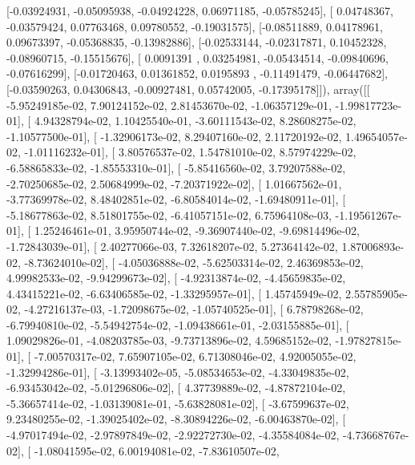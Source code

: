 \documentclass{article}
\begin{document}
       [-0.03924931, -0.05095938, -0.04924228,  0.06971185, -0.05785245],
       [ 0.04748367, -0.03579424,  0.07763468,  0.09780552, -0.19031575],
       [-0.08511889,  0.04178961,  0.09673397, -0.05368835, -0.13982886],
       [-0.02533144, -0.02317871,  0.10452328, -0.08960715, -0.15515676],
       [ 0.0091391 ,  0.03254981, -0.05434514, -0.09840696, -0.07616299],
       [-0.01720463,  0.01361852,  0.0195893 , -0.11491479, -0.06447682],
       [-0.03590263,  0.04306843, -0.00927481,  0.05742005, -0.17395178]]), array([[ -5.95249185e-02,   7.90124152e-02,   2.81453670e-02,
         -1.06357129e-01,  -1.99817723e-01],
       [  4.94328794e-02,   1.10425540e-01,  -3.60111543e-02,
          8.28608275e-02,  -1.10577500e-01],
       [ -1.32906173e-02,   8.29407160e-02,   2.11720192e-02,
          1.49654057e-02,  -1.01116232e-01],
       [  3.80576537e-02,   1.54781010e-02,   8.57974229e-02,
         -6.58865833e-02,  -1.85553310e-01],
       [ -5.85416560e-02,   3.79207588e-02,  -2.70250685e-02,
          2.50684999e-02,  -7.20371922e-02],
       [  1.01667562e-01,  -3.77369978e-02,   8.48402851e-02,
         -6.80584014e-02,  -1.69480911e-01],
       [ -5.18677863e-02,   8.51801755e-02,  -6.41057151e-02,
          6.75964108e-03,  -1.19561267e-01],
       [  1.25246461e-01,   3.95950744e-02,  -9.36907440e-02,
         -9.69814496e-02,  -1.72843039e-01],
       [  2.40277066e-03,   7.32618207e-02,   5.27364142e-02,
          1.87006893e-02,  -8.73624010e-02],
       [ -4.05036888e-02,  -5.62503314e-02,   2.46369853e-02,
          4.99982533e-02,  -9.94299673e-02],
       [ -4.92313874e-02,  -4.45659835e-02,   4.43415221e-02,
         -6.63406585e-02,  -1.33295957e-01],
       [  1.45745949e-02,   2.55785905e-02,  -4.27216137e-03,
         -1.72098675e-02,  -1.05740525e-01],
       [  6.78798268e-02,  -6.79940810e-02,  -5.54942754e-02,
         -1.09438661e-01,  -2.03155885e-01],
       [  1.09029826e-01,  -4.08203785e-03,  -9.73713896e-02,
          4.59685152e-02,  -1.97827815e-01],
       [ -7.00570317e-02,   7.65907105e-02,   6.71308046e-02,
          4.92005055e-02,  -1.32994286e-01],
       [ -3.13993402e-05,  -5.08534653e-02,  -4.33049835e-02,
         -6.93453042e-02,  -5.01296806e-02],
       [  4.37739889e-02,  -4.87872104e-02,  -5.36657414e-02,
         -1.03139081e-01,  -5.63828081e-02],
       [ -3.67599637e-02,   9.23480255e-02,  -1.39025402e-02,
         -8.30894226e-02,  -6.00463870e-02],
       [ -4.97017494e-02,  -2.97897849e-02,  -2.92272730e-02,
         -4.35584084e-02,  -4.73668767e-02],
       [ -1.08041595e-02,   6.00194081e-02,  -7.83610507e-02,
\end{document}
